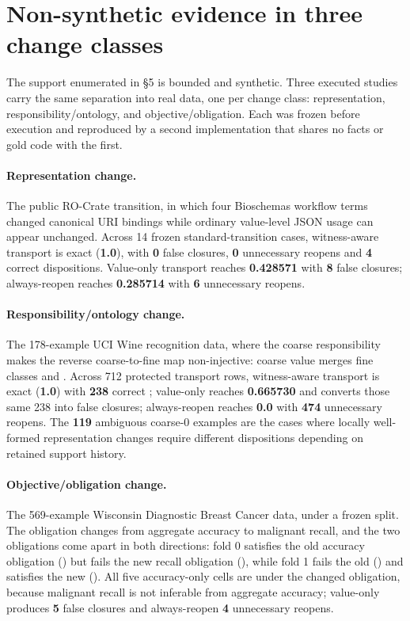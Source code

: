 \section{Non-synthetic evidence in three change classes}

The support enumerated in \S5 is bounded and synthetic. Three executed studies
carry the same separation into real data, one per change class: representation,
responsibility/ontology, and objective/obligation. Each was frozen before
execution and reproduced by a second implementation that shares no facts or gold
code with the first.

\paragraph{Representation change.} The public RO-Crate 
transition, in which four Bioschemas workflow terms changed canonical URI
bindings while ordinary value-level JSON usage can appear unchanged. Across 14
frozen standard-transition cases, witness-aware transport is exact
(\textbf{1.0}), with \textbf{0} false closures, \textbf{0} unnecessary reopens
and \textbf{4} correct  dispositions. Value-only transport
reaches \textbf{0.428571} with \textbf{8} false closures; always-reopen reaches
\textbf{0.285714} with \textbf{6} unnecessary reopens.

\paragraph{Responsibility/ontology change.} The 178-example UCI Wine recognition
data, where the coarse responsibility  makes the reverse
coarse-to-fine map non-injective: coarse value  merges fine classes
 and . Across 712 protected transport rows, witness-aware
transport is exact (\textbf{1.0}) with \textbf{238} correct
; value-only reaches \textbf{0.665730} and converts those
same 238 into false closures; always-reopen reaches \textbf{0.0} with
\textbf{474} unnecessary reopens. The \textbf{119} ambiguous coarse-0 examples
are the cases where locally well-formed representation changes require different
dispositions depending on retained support history.

\paragraph{Objective/obligation change.} The 569-example Wisconsin Diagnostic
Breast Cancer data, under a frozen  split. The obligation changes from
aggregate accuracy to malignant recall, and the two obligations come apart in
both directions: fold 0 satisfies the old accuracy obligation
() but fails the new recall obligation
(), while fold 1 fails the old () and
satisfies the new (). All five accuracy-only cells are
 under the changed obligation, because malignant recall is
not inferable from aggregate accuracy; value-only produces \textbf{5} false
closures and always-reopen \textbf{4} unnecessary reopens.

